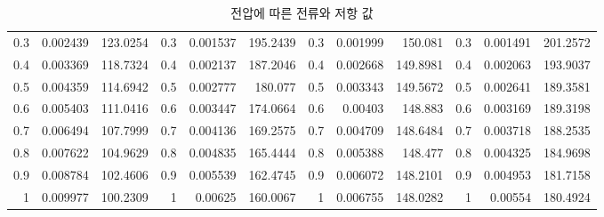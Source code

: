 \begin{table}[!h]
{\begin{tabular}{rrrrrrrrrrrr}
0.3 & 0.002439 & 123.0254 & 0.3 & 0.001537 & 195.2439 & 0.3 & 0.001999 & 150.081 & 0.3 & 0.001491 & 201.2572 \\
0.4 & 0.003369 & 118.7324 & 0.4 & 0.002137 & 187.2046 & 0.4 & 0.002668 & 149.8981 & 0.4 & 0.002063 & 193.9037 \\
0.5 & 0.004359 & 114.6942 & 0.5 & 0.002777 & 180.077 & 0.5 & 0.003343 & 149.5672 & 0.5 & 0.002641 & 189.3581 \\
0.6 & 0.005403 & 111.0416 & 0.6 & 0.003447 & 174.0664 & 0.6 & 0.00403 & 148.883 & 0.6 & 0.003169 & 189.3198 \\
0.7 & 0.006494 & 107.7999 & 0.7 & 0.004136 & 169.2575 & 0.7 & 0.004709 & 148.6484 & 0.7 & 0.003718 & 188.2535 \\
0.8 & 0.007622 & 104.9629 & 0.8 & 0.004835 & 165.4444 & 0.8 & 0.005388 & 148.477 & 0.8 & 0.004325 & 184.9698 \\
0.9 & 0.008784 & 102.4606 & 0.9 & 0.005539 & 162.4745 & 0.9 & 0.006072 & 148.2101 & 0.9 & 0.004953 & 181.7158 \\
1 & 0.009977 & 100.2309 & 1 & 0.00625 & 160.0067 & 1 & 0.006755 & 148.0282 & 1 & 0.00554 & 180.4924 \\ \hline
\end{tabular}}
\caption{전압에 따른 전류와 저항 값}
\end{table}